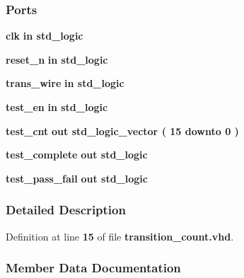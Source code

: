 \subsubsection*{Ports}
 \begin{DoxyCompactItemize}
\item 
{\bf clk}  {\bfseries {\bfseries \textcolor{keywordflow}{in}\textcolor{vhdlchar}{ }}} {\bfseries \textcolor{comment}{std\+\_\+logic}\textcolor{vhdlchar}{ }} 
\item 
{\bf reset\+\_\+n}  {\bfseries {\bfseries \textcolor{keywordflow}{in}\textcolor{vhdlchar}{ }}} {\bfseries \textcolor{comment}{std\+\_\+logic}\textcolor{vhdlchar}{ }} 
\item 
{\bf trans\+\_\+wire}  {\bfseries {\bfseries \textcolor{keywordflow}{in}\textcolor{vhdlchar}{ }}} {\bfseries \textcolor{comment}{std\+\_\+logic}\textcolor{vhdlchar}{ }} 
\item 
{\bf test\+\_\+en}  {\bfseries {\bfseries \textcolor{keywordflow}{in}\textcolor{vhdlchar}{ }}} {\bfseries \textcolor{comment}{std\+\_\+logic}\textcolor{vhdlchar}{ }} 
\item 
{\bf test\+\_\+cnt}  {\bfseries {\bfseries \textcolor{keywordflow}{out}\textcolor{vhdlchar}{ }}} {\bfseries \textcolor{comment}{std\+\_\+logic\+\_\+vector}\textcolor{vhdlchar}{ }\textcolor{vhdlchar}{(}\textcolor{vhdlchar}{ }\textcolor{vhdlchar}{ } \textcolor{vhdldigit}{15} \textcolor{vhdlchar}{ }\textcolor{keywordflow}{downto}\textcolor{vhdlchar}{ }\textcolor{vhdlchar}{ } \textcolor{vhdldigit}{0} \textcolor{vhdlchar}{ }\textcolor{vhdlchar}{)}\textcolor{vhdlchar}{ }} 
\item 
{\bf test\+\_\+complete}  {\bfseries {\bfseries \textcolor{keywordflow}{out}\textcolor{vhdlchar}{ }}} {\bfseries \textcolor{comment}{std\+\_\+logic}\textcolor{vhdlchar}{ }} 
\item 
{\bf test\+\_\+pass\+\_\+fail}  {\bfseries {\bfseries \textcolor{keywordflow}{out}\textcolor{vhdlchar}{ }}} {\bfseries \textcolor{comment}{std\+\_\+logic}\textcolor{vhdlchar}{ }} 
\end{DoxyCompactItemize}


\subsubsection{Detailed Description}


Definition at line {\bf 15} of file {\bf transition\+\_\+count.\+vhd}.



\subsubsection{Member Data Documentation}
